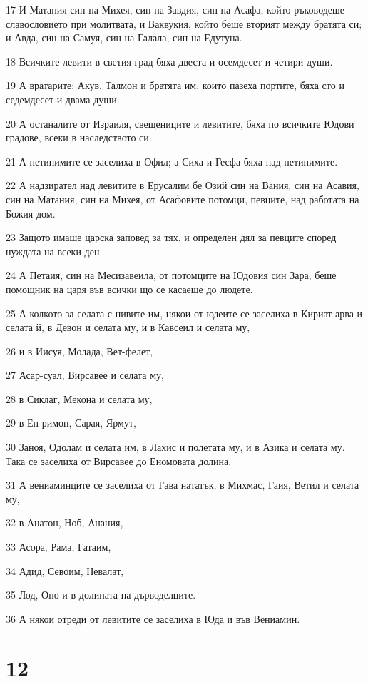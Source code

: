 \par 17 И Матания син на Михея, син на Завдия, син на Асафа, който ръководеше славословието при молитвата, и Ваквукия, който беше вторият между братята си; и Авда, син на Самуя, син на Галала, син на Едутуна.
\par 18 Всичките левити в светия град бяха двеста и осемдесет и четири души.
\par 19 А вратарите: Акув, Талмон и братята им, които пазеха портите, бяха сто и седемдесет и двама души.
\par 20 А останалите от Израиля, свещениците и левитите, бяха по всичките Юдови градове, всеки в наследството си.
\par 21 А нетинимите се заселиха в Офил; а Сиха и Гесфа бяха над нетинимите.
\par 22 А надзирател над левитите в Ерусалим бе Озий син на Вания, син на Асавия, син на Матания, син на Михея, от Асафовите потомци, певците, над работата на Божия дом.
\par 23 Защото имаше царска заповед за тях, и определен дял за певците според нуждата на всеки ден.
\par 24 А Петаия, син на Месизавеила, от потомците на Юдовия син Зара, беше помощник на царя във всички що се касаеше до людете.
\par 25 А колкото за селата с нивите им, някои от юдеите се заселиха в Кириат-арва и селата й, в Девон и селата му, и в Кавсеил и селата му,
\par 26 и в Иисуя, Молада, Вет-фелет,
\par 27 Асар-суал, Вирсавее и селата му,
\par 28 в Сиклаг, Мекона и селата му,
\par 29 в Ен-римон, Сарая, Ярмут,
\par 30 Заноя, Одолам и селата им, в Лахис и полетата му, и в Азика и селата му. Така се заселиха от Вирсавее до Еномовата долина.
\par 31 А вениаминците се заселиха от Гава нататък, в Михмас, Гаия, Ветил и селата му,
\par 32 в Анатон, Ноб, Анания,
\par 33 Асора, Рама, Гатаим,
\par 34 Адид, Севоим, Невалат,
\par 35 Лод, Оно и в долината на дърводелците.
\par 36 А някои отреди от левитите се заселиха в Юда и във Вениамин.

\chapter{12}


